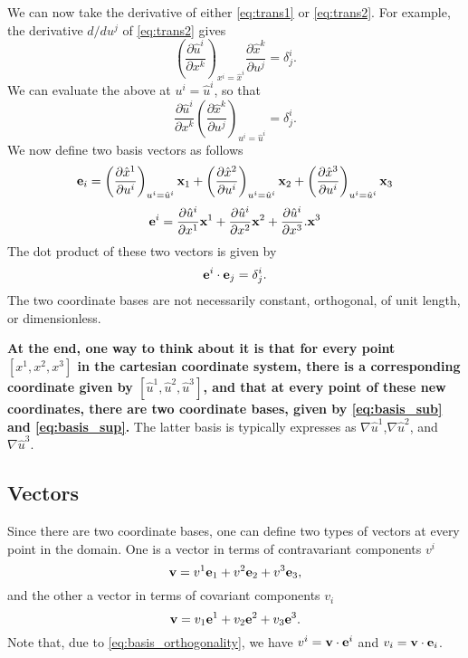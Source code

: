 \documentclass[11pt]{article}
\newcommand{\uhat}{\hat{u}}
\newcommand{\xhat}{\hat{x}}
\begin{document}
We can now take the derivative of either \cref{eq:trans1} or \cref{eq:trans2}. For example, the derivative $d/du^j$ of \cref{eq:trans2} gives
\begin{equation}
    \left ( \frac{\partial \uhat^i}{\partial x^k} \right)_{x^i = \xhat^i} \frac{\partial \xhat^k}{\partial u^j} = \delta^i_j.
\end{equation}
We can evaluate the above at $u^i = \hat{u}^i$, so that
\begin{equation}
     \frac{\partial \uhat^i}{\partial x^k} \left( \frac{\partial \xhat^k}{\partial u^j} \right)_{u^i = \hat{u}^i} = \delta^i_j.
\end{equation}
We now define two basis vectors as follows
\begin{equation}
\label{eq:basis_sub}
    \evec_i = \left ( \frac{ \partial \xhat^1}{\partial u^i} \right)_{u^i = \hat{u}^i} \xvec_1 + \left ( \frac{ \partial \xhat^2}{\partial u^i} \right)_{u^i = \hat{u}^i} \xvec_2 + \left ( \frac{ \partial \xhat^3}{\partial u^i} \right)_{u^i = \hat{u}^i} \xvec_3
\end{equation}
\begin{equation}
\label{eq:basis_sup}
    \evec^i = \frac{ \partial \uhat^i}{\partial x^1} \xvec^1 + \frac{ \partial \uhat^i}{\partial x^2} \xvec^2 + \frac{ \partial \uhat^i}{\partial x^3}. \xvec^3
\end{equation}
The dot product of these two vectors is given by
\begin{equation}
\label{eq:basis_orthogonality}
    \mathbf{e}^i \cdot \mathbf{e}_j = \delta^i_j.
\end{equation}
The two coordinate bases are not necessarily constant, orthogonal, of unit length, or dimensionless.

\textbf{At the end, one way to think about it is that for every point $[x^1,x^2,x^3]$ in the cartesian coordinate system, there is a corresponding coordinate given by $[\uhat^1,\uhat^2,\uhat^3]$, and that at every point of these new coordinates, there are two coordinate bases, given by \cref{eq:basis_sub} and \cref{eq:basis_sup}.} The latter basis is typically expresses as $\nabla \uhat^1$,$\nabla \uhat^2$, and $\nabla \uhat^3$.

\subsection{Vectors}
Since there are two coordinate bases, one can define two types of vectors at every point in the domain. One is a vector in terms of contravariant components $v^i$ 
\begin{equation}
    \mathbf{v} = v^1 \mathbf{e}_1 + v^2 \mathbf{e}_2 + v^3 \mathbf{e}_3,
\end{equation}
and the other a vector in terms of covariant components $v_i$
\begin{equation}
    \mathbf{v} = v_1 \mathbf{e}^1 + v_2 \mathbf{e}^2 + v_3 \mathbf{e}^3.
\end{equation}
Note that, due to \cref{eq:basis_orthogonality}, we have $v^i = \mathbf{v} \cdot \mathbf{e}^i$ and $v_i = \mathbf{v} \cdot \mathbf{e}_i$.
\end{document}
